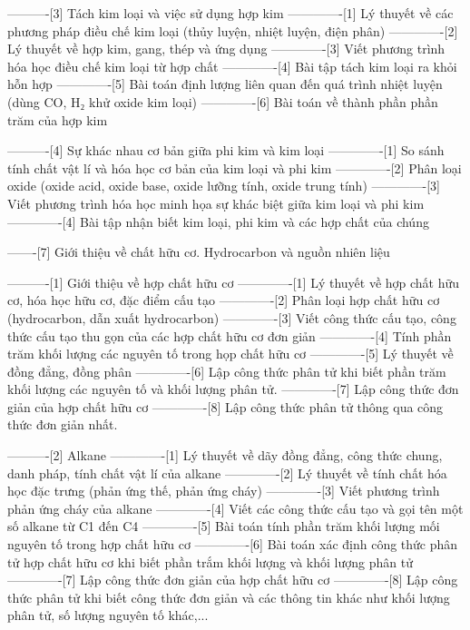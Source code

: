 ----------[3] Tách kim loại và việc sử dụng hợp kim
-------------[1] Lý thuyết về các phương pháp điều chế kim loại (thủy luyện, nhiệt luyện, điện phân)
-------------[2] Lý thuyết về hợp kim, gang, thép và ứng dụng
-------------[3] Viết phương trình hóa học điều chế kim loại từ hợp chất
-------------[4] Bài tập tách kim loại ra khỏi hỗn hợp
-------------[5] Bài toán định lượng liên quan đến quá trình nhiệt luyện (dùng CO, H₂ khử oxide kim loại)
-------------[6] Bài toán về thành phần phần trăm của hợp kim

----------[4] Sự khác nhau cơ bản giữa phi kim và kim loại
-------------[1] So sánh tính chất vật lí và hóa học cơ bản của kim loại và phi kim
-------------[2] Phân loại oxide (oxide acid, oxide base, oxide lưỡng tính, oxide trung tính)
-------------[3] Viết phương trình hóa học minh họa sự khác biệt giữa kim loại và phi kim
-------------[4] Bài tập nhận biết kim loại, phi kim và các hợp chất của chúng

-------[7] Giới thiệu về chất hữu cơ. Hydrocarbon và nguồn nhiên liệu

----------[1] Giới thiệu về hợp chất hữu cơ
-------------[1] Lý thuyết về hợp chất hữu cơ, hóa học hữu cơ, đặc điểm cấu tạo
-------------[2] Phân loại hợp chất hữu cơ (hydrocarbon, dẫn xuất hydrocarbon)
-------------[3] Viết công thức cấu tạo, công thức cấu tạo thu gọn của các hợp chất hữu cơ đơn giản
-------------[4] Tính phần trăm khối lượng các nguyên tố trong họp chất hữu cơ
-------------[5] Lý thuyết về đồng đẳng, đồng phân
-------------[6] Lập công thức phân tử khi biết phần trăm khối lượng các nguyên tố và khối lượng phân tử.
-------------[7] Lập công thức đơn giản của hợp chất hữu cơ
-------------[8] Lập công thức phân tử thông qua công thức đơn giản nhất.

----------[2] Alkane
-------------[1] Lý thuyết về dãy đồng đẳng, công thức chung, danh pháp, tính chất vật lí của alkane
-------------[2] Lý thuyết về tính chất hóa học đặc trưng (phản ứng thế, phản ứng cháy)
-------------[3] Viết phương trình phản ứng cháy của alkane
-------------[4] Viết các công thức cấu tạo và gọi tên một số alkane từ C1 đến C4
-------------[5] Bài toán tính phần trăm khối lượng mối nguyên tố trong hợp chất hữu cơ
-------------[6] Bài toán xác định công thức phân tử hợp chất hữu cơ khi biết phần trắm khối lượng và khối lượng phân tử
-------------[7] Lập công thức đơn giản của hợp chất hữu cơ
-------------[8] Lập công thức phân tử khi biết công thức đơn giản và các thông tin khác như khối lượng phân tử, số lượng nguyên tố khác,...

